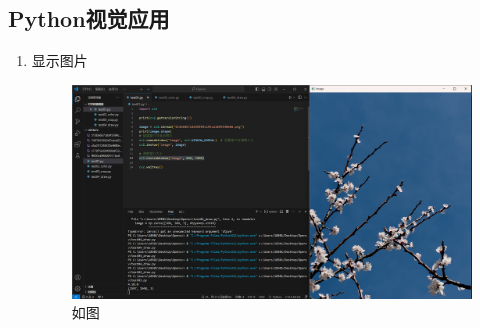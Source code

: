 \documentclass{ctexart}
\begin{document}
\subsection{Python视觉应用}
\begin{enumerate}
    \item 显示图片
    \begin{figure}[H]
        \centering
        \includegraphics[width=12cm]{bae69f4cc4273bbe5c67937cac4577a4.png}
        \caption{如图}
        \label{fig:1}
    \end{figure}


\end{enumerate}
\end{document}
